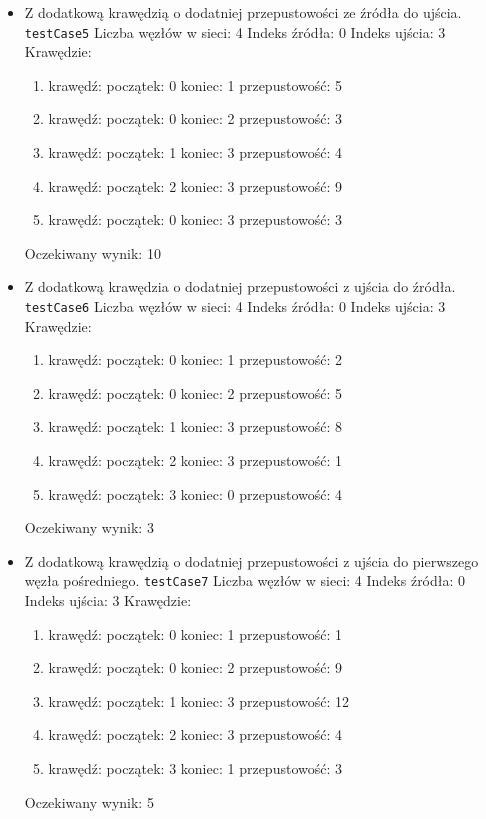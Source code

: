 \begin{itemize}[nosep]
    \item Z dodatkową krawędzią o dodatniej przepustowości ze źródła do ujścia.
    \texttt{testCase5}
    Liczba węzłów w sieci: 4
    Indeks źródła: 0
    Indeks ujścia: 3
    Krawędzie:
    \begin{enumerate}[nosep]
        \item krawędź:
        początek: 0
        koniec: 1
        przepustowość: 5
        \item krawędź:
        początek: 0
        koniec: 2
        przepustowość: 3
        \item krawędź:
        początek: 1
        koniec: 3
        przepustowość: 4
        \item krawędź:
        początek: 2
        koniec: 3
        przepustowość: 9
        \item krawędź:
        początek: 0
        koniec: 3
        przepustowość: 3
    \end{enumerate}
    Oczekiwany wynik: 10

    \item Z dodatkową krawędzia o dodatniej przepustowości z ujścia do źródła.
    \texttt{testCase6}
    Liczba węzłów w sieci: 4
    Indeks źródła: 0
    Indeks ujścia: 3
    Krawędzie:
    \begin{enumerate}[nosep]
        \item krawędź:
        początek: 0
        koniec: 1
        przepustowość: 2
        \item krawędź:
        początek: 0
        koniec: 2
        przepustowość: 5
        \item krawędź:
        początek: 1
        koniec: 3
        przepustowość: 8
        \item krawędź:
        początek: 2
        koniec: 3
        przepustowość: 1
        \item krawędź:
        początek: 3
        koniec: 0
        przepustowość: 4
    \end{enumerate}
    Oczekiwany wynik: 3

    \item Z dodatkową krawędzią o dodatniej przepustowości z ujścia do
    pierwszego węzła pośredniego.
    \texttt{testCase7}
    Liczba węzłów w sieci: 4
    Indeks źródła: 0
    Indeks ujścia: 3
    Krawędzie:
    \begin{enumerate}[nosep]
        \item krawędź:
        początek: 0
        koniec: 1
        przepustowość: 1
        \item krawędź:
        początek: 0
        koniec: 2
        przepustowość: 9
        \item krawędź:
        początek: 1
        koniec: 3
        przepustowość: 12
        \item krawędź:
        początek: 2
        koniec: 3
        przepustowość: 4
        \item krawędź:
        początek: 3
        koniec: 1
        przepustowość: 3
    \end{enumerate}
    Oczekiwany wynik: 5


\end{itemize}
